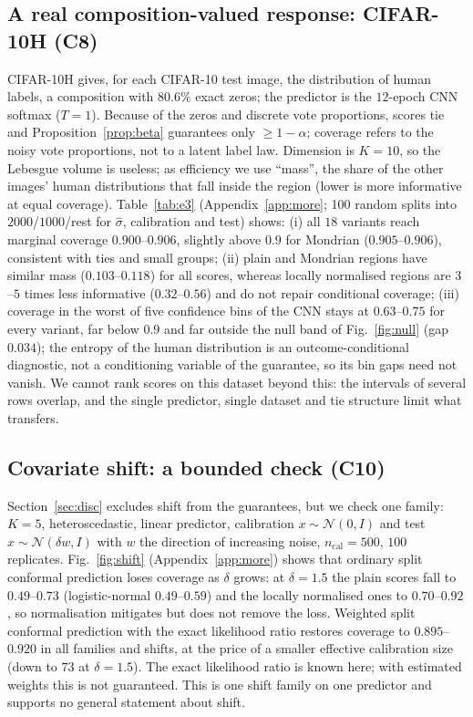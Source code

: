 \subsection{A real composition-valued response: CIFAR-10H (C8)}
CIFAR-10H gives, for each CIFAR-10 test image, the distribution of human labels, a composition with $80.6\%$ exact zeros; the predictor is the $12$-epoch CNN softmax ($T=1$). Because of the zeros and discrete vote proportions, scores tie and Proposition~\ref{prop:beta} guarantees only $\ge1-\alpha$; coverage refers to the noisy vote proportions, not to a latent label law. Dimension is $K=10$, so the Lebesgue volume is useless; as efficiency we use ``mass'', the share of the other images' human distributions that fall inside the region (lower is more informative at equal coverage). Table~\ref{tab:e3} (Appendix~\ref{app:more}; 100 random splits into $2000$/$1000$/rest for $\hat\sigma$, calibration and test) shows: (i) all $18$ variants reach marginal coverage $0.900$--$0.906$, slightly above $0.9$ for Mondrian ($0.905$--$0.906$), consistent with ties and small groups; (ii) plain and Mondrian regions have similar mass ($0.103$--$0.118$) for all scores, whereas locally normalised regions are $3$--$5$ times less informative ($0.32$--$0.56$) and do not repair conditional coverage; (iii) coverage in the worst of five confidence bins of the CNN stays at $0.63$--$0.75$ for every variant, far below $0.9$ and far outside the null band of Fig.~\ref{fig:null} (gap $0.034$); the entropy of the human distribution is an outcome-conditional diagnostic, not a conditioning variable of the guarantee, so its bin gaps need not vanish. We cannot rank scores on this dataset beyond this: the intervals of several rows overlap, and the single predictor, single dataset and tie structure limit what transfers.

\subsection{Covariate shift: a bounded check (C10)}
Section~\ref{sec:disc} excludes shift from the guarantees, but we check one family: $K=5$, heteroscedastic, linear predictor, calibration $x\sim\mathcal N(0,I)$ and test $x\sim\mathcal N(\delta w,I)$ with $w$ the direction of increasing noise, $n_{\mathrm{cal}}=500$, $100$ replicates. Fig.~\ref{fig:shift} (Appendix~\ref{app:more}) shows that ordinary split conformal prediction loses coverage as $\delta$ grows: at $\delta=1.5$ the plain scores fall to $0.49$--$0.73$ (logistic-normal $0.49$--$0.59$) and the locally normalised ones to $0.70$--$0.92$, so normalisation mitigates but does not remove the loss. Weighted split conformal prediction with the exact likelihood ratio \citep{tibshirani2019covariate} restores coverage to $0.895$--$0.920$ in all families and shifts, at the price of a smaller effective calibration size (down to $73$ at $\delta=1.5$). The exact likelihood ratio is known here; with estimated weights this is not guaranteed. This is one shift family on one predictor and supports no general statement about shift.
